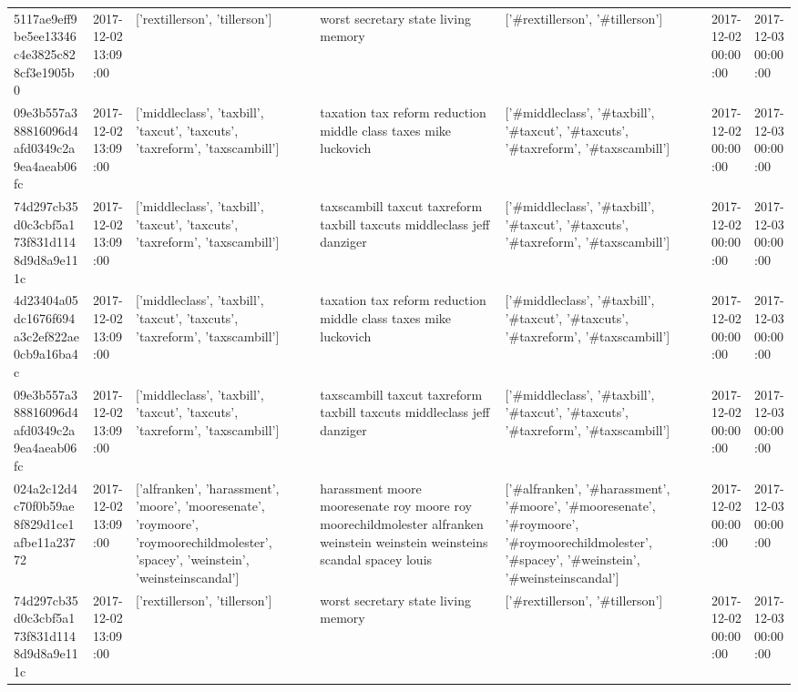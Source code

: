 \begin{tabular}{lllllll}
5117ae9eff9be5ee13346c4e3825c828cf3e1905b0 & 2017-12-02 13:09:00 & ['rextillerson', 'tillerson'] & worst secretary state living memory & ['#rextillerson', '#tillerson'] & 2017-12-02 00:00:00 & 2017-12-03 00:00:00 \\
09e3b557a388816096d4afd0349c2a9ea4aeab06fc & 2017-12-02 13:09:00 & ['middleclass', 'taxbill', 'taxcut', 'taxcuts', 'taxreform', 'taxscambill'] & taxation tax reform reduction middle class taxes mike luckovich & ['#middleclass', '#taxbill', '#taxcut', '#taxcuts', '#taxreform', '#taxscambill'] & 2017-12-02 00:00:00 & 2017-12-03 00:00:00 \\
74d297cb35d0c3cbf5a173f831d1148d9d8a9e111c & 2017-12-02 13:09:00 & ['middleclass', 'taxbill', 'taxcut', 'taxcuts', 'taxreform', 'taxscambill'] & taxscambill taxcut taxreform taxbill taxcuts middleclass jeff danziger & ['#middleclass', '#taxbill', '#taxcut', '#taxcuts', '#taxreform', '#taxscambill'] & 2017-12-02 00:00:00 & 2017-12-03 00:00:00 \\
4d23404a05dc1676f694a3c2ef822ae0cb9a16ba4c & 2017-12-02 13:09:00 & ['middleclass', 'taxbill', 'taxcut', 'taxcuts', 'taxreform', 'taxscambill'] & taxation tax reform reduction middle class taxes mike luckovich & ['#middleclass', '#taxbill', '#taxcut', '#taxcuts', '#taxreform', '#taxscambill'] & 2017-12-02 00:00:00 & 2017-12-03 00:00:00 \\
09e3b557a388816096d4afd0349c2a9ea4aeab06fc & 2017-12-02 13:09:00 & ['middleclass', 'taxbill', 'taxcut', 'taxcuts', 'taxreform', 'taxscambill'] & taxscambill taxcut taxreform taxbill taxcuts middleclass jeff danziger & ['#middleclass', '#taxbill', '#taxcut', '#taxcuts', '#taxreform', '#taxscambill'] & 2017-12-02 00:00:00 & 2017-12-03 00:00:00 \\
024a2c12d4c70f0b59ae8f829d1ce1afbe11a23772 & 2017-12-02 13:09:00 & ['alfranken', 'harassment', 'moore', 'mooresenate', 'roymoore', 'roymoorechildmolester', 'spacey', 'weinstein', 'weinsteinscandal'] & harassment moore mooresenate roy moore roy moorechildmolester alfranken weinstein weinstein weinsteins scandal spacey louis & ['#alfranken', '#harassment', '#moore', '#mooresenate', '#roymoore', '#roymoorechildmolester', '#spacey', '#weinstein', '#weinsteinscandal'] & 2017-12-02 00:00:00 & 2017-12-03 00:00:00 \\
74d297cb35d0c3cbf5a173f831d1148d9d8a9e111c & 2017-12-02 13:09:00 & ['rextillerson', 'tillerson'] & worst secretary state living memory & ['#rextillerson', '#tillerson'] & 2017-12-02 00:00:00 & 2017-12-03 00:00:00 \\

\end{tabular}
